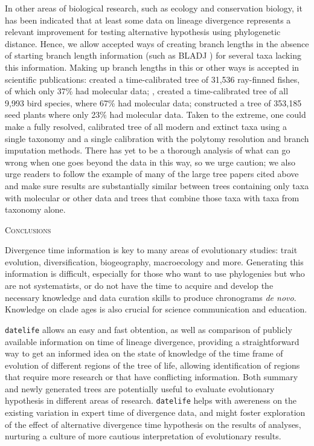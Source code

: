\documentclass[11pt,]{article}
\begin{document}
In other areas of biological research, such as ecology and conservation
biology, it has been indicated that at least some data on lineage
divergence represents a relevant improvement for testing alternative
hypothesis using phylogenetic distance. Hence, we allow accepted ways of
creating branch lengths in the absence of starting branch length
information (such as BLADJ \citep{Webb2008}) for several taxa lacking
this information. Making up branch lengths in this or other ways is
accepted in scientific publications: \citet{rabosky2018inverse} created
a time-calibrated tree of 31,536 ray-finned fishes, of which only 37\%
had molecular data; \citet{Jetz2012}, created a time-calibrated tree of
all 9,993 bird species, where 67\% had molecular data;
\citet{smith2018constructing} constructed a tree of 353,185 seed plants
where only 23\% had molecular data. Taken to the extreme, one could make
a fully resolved, calibrated tree of all modern and extinct taxa using a
single taxonomy and a single calibration with the polytomy resolution
and branch imputation methods. There has yet to be a thorough analysis
of what can go wrong when one goes beyond the data in this way, so we
urge caution; we also urge readers to follow the example of many of the
large tree papers cited above and make sure results are substantially
similar between trees containing only taxa with molecular or other data
and trees that combine those taxa with taxa from taxonomy alone.

\begin{center}
\textsc{Conclusions}
\end{center}

Divergence time information is key to many areas of evolutionary
studies: trait evolution, diversification, biogeography, macroecology
and more. Generating this information is difficult, especially for those
who want to use phylogenies but who are not systematists, or do not have
the time to acquire and develop the necessary knowledge and data
curation skills to produce chronograms \emph{de novo}. Knowledge on
clade ages is also crucial for science communication and education.

\texttt{datelife} allows an easy and fast obtention, as well as
comparison of publicly available information on time of lineage
divergence, providing a straightforward way to get an informed idea on
the state of knowledge of the time frame of evolution of different
regions of the tree of life, allowing identification of regions that
require more research or that have conflicting information. Both summary
and newly generated trees are potentially useful to evaluate
evolutionary hypothesis in different areas of research.
\texttt{datelife} helps with awereness on the existing variation in
expert time of divergence data, and might foster exploration of the
effect of alternative divergence time hypothesis on the results of
analyses, nurturing a culture of more cautious interpretation of
evolutionary results.
\end{document}
